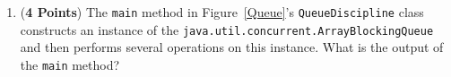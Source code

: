 \documentclass[12pt]{article}
\begin{document}
\begin{enumerate}
\begin{enumerate}
  \item ({\bf 4 Points}) The {\tt main} method in Figure~\ref{Queue}'s {\tt QueueDiscipline} class constructs an
    instance of the {\tt java.util.concurrent.ArrayBlockingQueue} and then performs several operations on this instance.
    What is the output of the {\tt main} method?



  \end{enumerate}







\end{enumerate}
\end{document}
